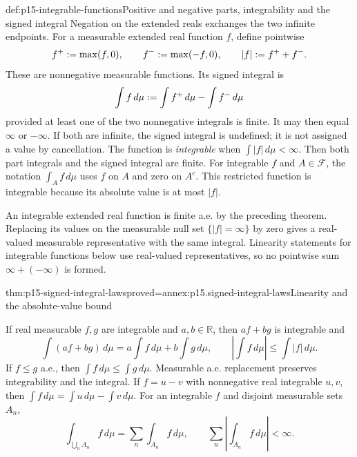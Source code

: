 \begin{hbdefinition}{def:p15-integrable-functions}{Positive and negative parts, integrability and the signed integral}
Negation on the extended reals exchanges the two infinite endpoints.
For a measurable extended real function \(f\), define pointwise
\[
 f^+\mathrel{:=}\max(f,0),\qquad f^-\mathrel{:=}\max(-f,0),\qquad
 |f|\mathrel{:=} f^++f^-.
\]
These are nonnegative measurable functions. Its signed integral is
\[
 \int f\,d\mu\mathrel{:=}\int f^+\,d\mu-\int f^-\,d\mu
\]
provided at least one of the two nonnegative integrals is finite.
It may then equal \(\infty\) or \(-\infty\). If both are infinite,
the signed integral is undefined; it is not assigned a value by cancellation.
The function is \emph{integrable} when \(\int|f|\,d\mu<\infty\).
Then both part integrals and the signed integral are finite.
For integrable \(f\) and \(A\in\mathcal F\), the notation
\(\int_A f\,d\mu\) uses \(f\) on \(A\) and zero on \(A^c\).
This restricted function is integrable because its absolute value is
at most \(|f|\).

An integrable extended real function is finite a.e. by the preceding
theorem. Replacing its values on the measurable null set
\(\{|f|=\infty\}\) by zero gives a real-valued measurable
representative with the same integral. Linearity statements for integrable
functions below use real-valued representatives, so no pointwise sum
\(\infty+(-\infty)\) is formed.
\end{hbdefinition}

\begin{hbtheorem}{thm:p15-signed-integral-laws}{proved=annex:p15.signed-integral-laws}{Linearity and the absolute-value bound}
\par\nobreak
If real measurable \(f,g\) are integrable and \(a,b\in\mathbb R\),
then \(af+bg\) is integrable and
\[
 \int(af+bg)\,d\mu=a\int f\,d\mu+b\int g\,d\mu,
 \qquad
 \left|\int f\,d\mu\right|\leq\int|f|\,d\mu.
\]
If \(f\leq g\) a.e., then \(\int f\,d\mu\leq\int g\,d\mu\).
Measurable a.e. replacement preserves integrability and the integral.
If \(f=u-v\) with nonnegative real integrable \(u,v\), then
\(\int f\,d\mu=\int u\,d\mu-\int v\,d\mu\).
For an integrable \(f\) and disjoint measurable sets \(A_n\),
\[
 \int_{\bigcup_n A_n}f\,d\mu=\sum_n\int_{A_n}f\,d\mu,
 \qquad
 \sum_n\left|\int_{A_n}f\,d\mu\right|<\infty.
\]
\end{hbtheorem}

